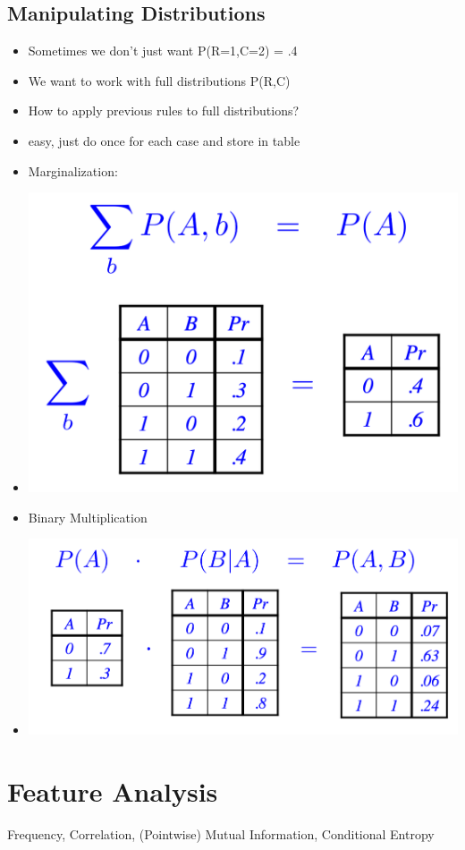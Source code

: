 \documentclass[11pt]{article}
\theoremstyle{definition}
\begin{document}
\subsection{Manipulating Distributions}
\begin{itemize}
  \item Sometimes we don’t just want P(R=1,C=2) = .4
  \item We want to work with full distributions P(R,C)
  \item How to apply previous rules to full distributions?
  \item easy, just do once for each case and store in table
  \item Marginalization:
  \item \includegraphics[width=\textwidth/2]{9.png}
  \item Binary Multiplication
  \item \includegraphics[width=\textwidth/2]{10.png}
\end{itemize}
\section{Feature Analysis}
Frequency, Correlation,
(Pointwise) Mutual Information,
Conditional Entropy
\end{document}
